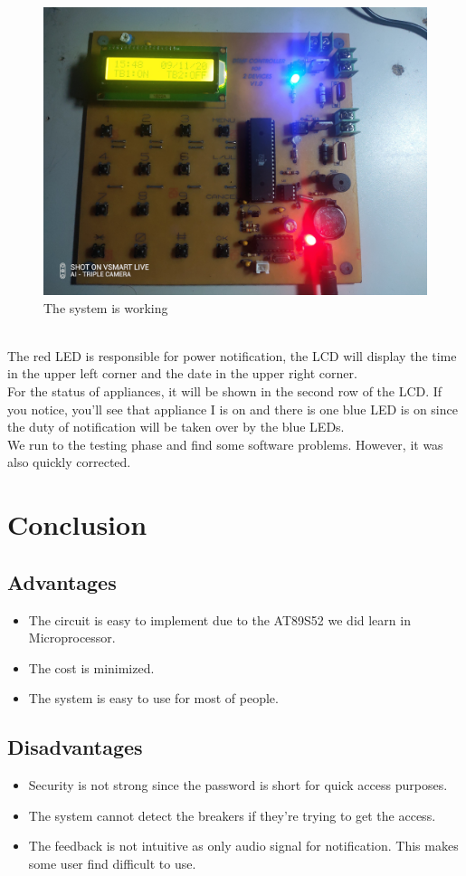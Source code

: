 \documentclass[a4paper]{article}
\begin{document}
\begin{figure}[h!]
\centering
\includegraphics[width=17cm]{images/working.jpg}
\caption*{The system is working}
\end{figure}\\
The red LED is responsible for power notification, the LCD will display the time in the upper left corner and the date in the upper right corner.\\
For the status of appliances, it will be shown in the second row of the LCD. If you notice, you'll see that appliance I is on and there is one blue LED is on since the duty of notification will be taken over by the blue LEDs.\\
We run to the testing phase and find some software problems. However, it was also quickly corrected.
\newpage
\section{Conclusion}
\subsection{Advantages}
\begin{itemize}
    \item The circuit is easy to implement due to the AT89S52 we did learn in Microprocessor.
    \item The cost is minimized.
    \item The system is easy to use for most of people.
\end{itemize}
\subsection{Disadvantages}
\begin{itemize}
    \item Security is not strong since the password is short for quick access purposes.
    \item The system cannot detect the breakers if they're trying to get the access.
    \item The feedback is not intuitive as only audio signal for notification. This makes some user find difficult to use.
\end{itemize}
\end{document}
